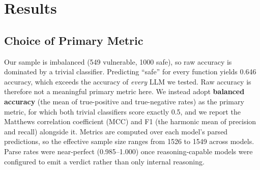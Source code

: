 \documentclass[computers,article,submit,moreauthors]{Definitions/mdpi}
\begin{document}
\section{Results}\label{sec:results}

\subsection{Choice of Primary Metric}
Our sample is imbalanced (549 vulnerable, 1000 safe), so raw accuracy is dominated by a trivial classifier. Predicting ``safe'' for every function yields 0.646 accuracy, which exceeds the accuracy of \emph{every} LLM we tested. Raw accuracy is therefore not a meaningful primary metric here. We instead adopt \textbf{balanced accuracy} (the mean of true-positive and true-negative rates) as the primary metric, for which both trivial classifiers score exactly 0.5, and we report the Matthews correlation coefficient (MCC) and F1 (the harmonic mean of precision and recall) alongside it. Metrics are computed over each model's parsed predictions, so the effective sample size ranges from 1526 to 1549 across models. Parse rates were near-perfect (0.985--1.000) once reasoning-capable models were configured to emit a verdict rather than only internal reasoning.
\end{document}
